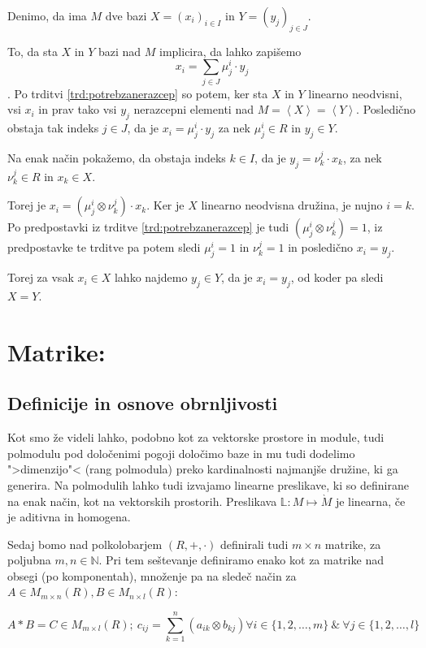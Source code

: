 \documentclass[mat1]{fmfdelo}
\newcommand{\N}{\mathbb{N}}
\newcommand{\Gen}[1]{\ensuremath{\left<{#1}\right>}}
\begin{document}
\begin{dokaz}
	Denimo, da ima $M$ dve bazi $X=(x_i)_{i\in I}$ in $Y=(y_j)_{j \in J}$. 
	
	To, da sta $X$ in $Y$ bazi nad $M$ implicira, da lahko zapišemo $$x_i = \sum_{j\in J}\mu_j^i\cdot y_j $$.
	Po trditvi \ref{trd:potrebzanerazcep} so potem, ker sta $X$ in $Y$ linearno neodvisni, vsi $x_i$ in prav tako vsi $y_j$ nerazcepni elementi nad $M = \Gen{X} = \Gen{Y}$. Posledično obstaja tak indeks $j\in J$, da je $x_i = \mu_j^i \cdot y_j$ za nek $\mu_j^i \in R$ in $y_j\in Y$.
	
	Na enak način pokažemo, da obstaja indeks $k\in I$, da je $y_j = \nu_k^j \cdot x_k$, za nek $\nu_k^j \in R$ in $x_k \in X$.

	Torej je $x_i = (\mu_j^i \otimes \nu_k^j) \cdot x_k$. Ker je $X$ linearno neodvisna družina, je nujno $i = k$. Po predpostavki iz trditve \ref{trd:potrebzanerazcep} je tudi $(\mu_j^i \otimes \nu_k^j) = 1$, iz predpostavke te trditve pa potem sledi $\mu_j^i = 1$ in $\nu_k^j = 1$ in posledično $x_i = y_j$.
	
	Torej za vsak $x_i\in X$ lahko najdemo $y_j\in Y$, da je $x_i = y_j$, od koder pa sledi $X = Y$.
\end{dokaz}

\section{Matrike:}

\subsection{Definicije in osnove obrnljivosti}

Kot smo že videli lahko, podobno kot za vektorske prostore in module, tudi polmodulu pod določenimi pogoji določimo baze in mu tudi dodelimo ">dimenzijo"< (rang polmodula) preko kardinalnosti najmanjše družine, ki ga generira. Na polmodulih lahko tudi izvajamo linearne preslikave, ki so definirane na enak način, kot na vektorskih prostorih. Preslikava $\mathbb{L}: M \mapsto \grave{M}$ je linearna, če je aditivna in homogena.

Sedaj bomo nad polkolobarjem $(R, +, \cdot)$ definirali tudi $m\times n$ matrike, za poljubna $m,n\in\N$. Pri tem seštevanje definiramo enako kot za matrike nad obsegi (po komponentah), množenje pa na sledeč način za $A\in M_{m\times n}(R), B\in M_{n\times l}(R)$:

$$ 
	A*B = C \in M_{m\times l}(R);~ c_{ij} = \sum_{k = 1}^{n}(a_{ik}\otimes b_{kj}) \forall i \in \{1, 2, \ldots, m\}~\&~\forall j \in \{1, 2, \ldots, l\}
$$
\end{document}
